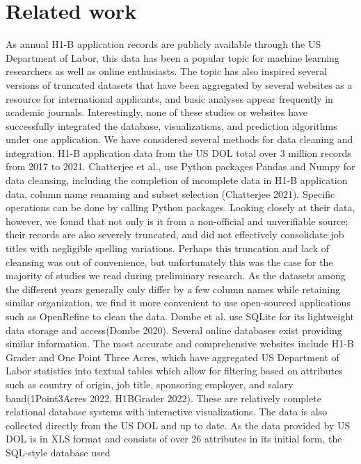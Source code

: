 \documentclass[sigconf]{acmart}
\begin{document}
\section{Related work}

As annual H1-B application records are publicly available through the US Department of Labor, 
this data has been a popular topic for machine learning researchers as well as online enthusiasts. 
The topic has also inspired several versions of truncated datasets that have been aggregated by several websites as a resource 
for international applicants, and basic analyses appear frequently in academic journals. Interestingly, none of these studies or 
websites have successfully integrated the database, visualizations, and prediction algorithms under one application. 
We have considered several methods for data cleaning and integration. H1-B application data from the US DOL total over 3 million 
records from 2017 to 2021. Chatterjee et al., use Python packages Pandas and Numpy for data cleansing, including the 
completion of incomplete data in H1-B application data, column name renaming and subset selection (Chatterjee 2021). Specific operations can be done 
by calling Python packages. Looking closely at their data, however, we found that not only is it from a non-official and unverifiable 
source; their records are also severely truncated, and did not effectively consolidate job titles with negligible spelling variations. 
Perhaps this truncation and lack of cleansing was out of convenience, but unfortunately this was the case for the majority of studies 
we read during preliminary research. As the datasets among the different years generally only differ by a few column names while 
retaining similar organization, we find it more convenient to use open-sourced applications such as OpenRefine to clean the data. 
Dombe et al. use SQLite for its lightweight data storage and access(Dombe 2020).
Several online databases exist providing similar information. The most accurate and comprehensive websites include H1-B Grader and 
One Point Three Acres, which have aggregated US Department of Labor statistics into textual tables which allow for filtering based 
on attributes such as country of origin, job title, sponsoring employer, and salary band(1Point3Acres 2022, H1BGrader 2022). These are relatively complete 
relational database systems with interactive visualizations. The data is also collected directly from the US DOL and up to date. 
As the data provided by US DOL is in XLS format and consists of over 26 attributes in its initial form, the SQL-style database used 
\end{document}
